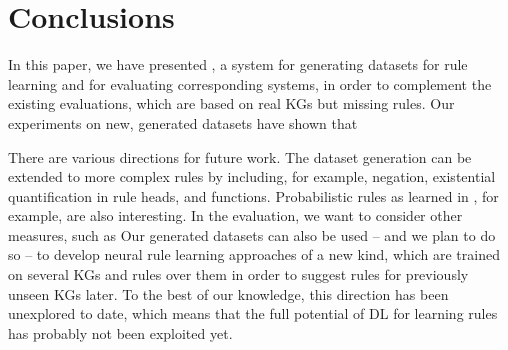 \section{Conclusions}

In this paper, we have presented \tool, a system for generating datasets for rule learning and for evaluating corresponding systems, in order to complement the existing evaluations, which are based on real KGs but missing rules. 
Our experiments on new, generated datasets have shown that 

There are various directions for future work. 
The dataset generation can be extended to more complex rules by including, for example, negation, existential quantification in rule heads, and functions.
Probabilistic rules as learned in \cite{Manhaeve+-NIPS18:deepproblog}, for example, are also interesting.
In the evaluation, we want to consider other measures, such as 
\cristina{\dots}
Our generated datasets can also be used -- and we plan to do so -- 
to develop neural rule learning approaches of a new kind, which are trained on several KGs and rules over them in order to suggest rules for previously unseen KGs later.
% 
% 
To the best of our knowledge, this direction has been unexplored to date, which means that the full potential of DL for learning rules has probably not been exploited yet.


